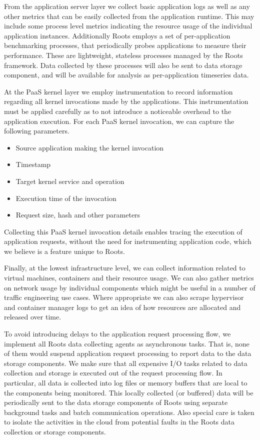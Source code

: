 From the application server layer we collect basic application logs as well as any other
metrics that can be easily collected from the application runtime. This may include some process level
metrics indicating the resource usage of the individual application instances. Additionally Roots
employs a set of per-application benchmarking processes, that periodically probes applications
to measure their performance. These are lightweight, stateless processes managed by the Roots framework.
Data collected by these processes will also be sent to data storage component, and will be available
for analysis as per-application timeseries data.

At the PaaS kernel layer we employ instrumentation to record information regarding all kernel invocations
made by the applications. This instrumentation must be applied carefully as to not introduce a noticeable
overhead to the application execution. For each PaaS kernel invocation, we can capture the 
following parameters.
\begin{itemize}
\item Source application making the kernel invocation
\item Timestamp
\item Target kernel service and operation
\item Execution time of the invocation
\item Request size, hash and other parameters
\end{itemize}
Collecting this PaaS kernel invocation details enables tracing the execution of application 
requests, without the need for instrumenting application code, which we believe is a feature 
unique to Roots. 

Finally, at the lowest infrastructure level, we can collect information related to virtual machines, containers
and their resource usage. We can also gather metrics on network usage by individual components which
might be useful in a number of traffic engineering use cases. Where appropriate we can also scrape
hypervisor and container manager logs to get an idea of how resources are allocated and released over
time.

To avoid introducing delays to the application request processing flow, we implement
all Roots data collecting agents as asynchronous tasks. That is, none of them would
suspend application request processing to report data to the data storage components.
We make sure that all expensive I/O tasks related to data collection and storage is
executed out of the request processing flow.
In particular, all data is collected into log files or memory buffers that are local to the components being
monitored. This locally collected (or buffered) data will be periodically sent
to the data storage components of Roots using separate background tasks and batch communication
operations. Also special care is taken to isolate the activities in the cloud from potential
faults in the Roots data collection or storage components.

